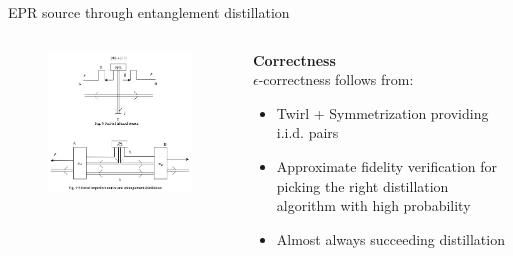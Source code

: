 \documentclass[final]{beamer}
\newlength{\twocolwid}
\begin{document}
\begin{frame}[t]
\begin{columns}[t]
\begin{column}{\twocolwid}
\begin{block}{EPR source through entanglement distillation}
\begin{columns}
    \begin{column}{.40\textwidth}
       \begin{figure}
         \includegraphics[width=0.95\linewidth]{direct_quantum_link_imperfect_filtered.jpg}
       \end{figure}
    \end{column}%
    
    \hfill%
    
    \begin{column}{.60\textwidth}
       \centering
       \textbf{Correctness}\\[.2cm]
       $\epsilon$-correctness follows from:
       \begin{itemize}
           \item Twirl + Symmetrization providing i.i.d. pairs
           \item Approximate fidelity verification for picking the right distillation algorithm with high probability
           \item Almost always succeeding distillation 
       \end{itemize}
    \end{column}%
\end{columns}

\vskip 2cm 


\end{block}
\end{column}
\end{columns}
\end{frame}
\end{document}
